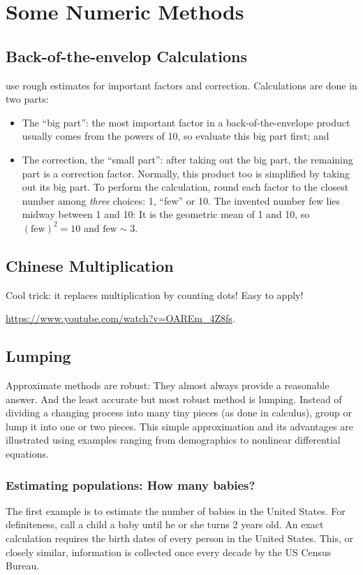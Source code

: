 \section{Some Numeric Methods}

\subsection{Back-of-the-envelop Calculations}
%
%
 use rough estimates for important factors and correction. Calculations are done in two parts:
\begin{itemize}
\item The ``big part'': the most important factor in a back-of-the-envelope product usually comes from the powers of 10, so evaluate this big part first; and
%
\item The correction, the ``small part'': after taking out the big part, the remaining part is a correction factor. Normally, this product too is simplified by taking out its big part. To perform the calculation, round each factor to the closest number among \emph{three} choices: 1, ``few'' or 10. The invented number few lies midway between 1 and 10: It is the geometric mean of 1 and 10, so $(\text{few})^2 = 10$ and $\text{few} \sim 3$.
\end{itemize}


\subsection{Chinese Multiplication}
Cool trick: it replaces multiplication by counting dots! Easy to apply!

\url{https://www.youtube.com/watch?v=OAREm_4Z8fs}.


\subsection{Lumping}
Approximate methods are robust: They almost always provide a reasonable answer. And the least accurate but most robust method is lumping. Instead of dividing a changing process into many tiny pieces (as done in calculus), group or lump it into one or two pieces. This simple approximation and its advantages are illustrated using examples ranging from demographics to nonlinear differential equations.

\subsubsection{Estimating populations: How many babies?}
The first example is to estimate the number of babies in the United States. For definiteness, call a child a baby until he or she turns 2 years old. An exact calculation requires the birth dates of every person in the United States. This, or closely similar, information is collected once every decade by the US Census Bureau.


